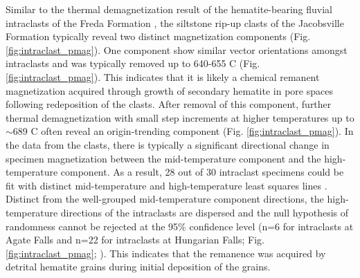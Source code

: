 \documentclass[draft]{agujournal2019}
\begin{document}
Similar to the thermal demagnetization result of the hematite-bearing fluvial intraclasts of the Freda Formation \cite{Swanson-Hysell2019b}, the siltstone rip-up clasts of the Jacobsville Formation typically reveal two distinct magnetization components (Fig. \ref{fig:intraclast_pmag}). One component show similar vector orientations amongst intraclasts and was typically removed up to 640-655 \textdegree C (Fig. \ref{fig:intraclast_pmag}). This indicates that it is likely a chemical remanent magnetization acquired through growth of secondary hematite in pore spaces following redeposition of the clasts. After removal of this component, further thermal demagnetization with small step increments at higher temperatures up to $\sim$689 \textdegree C often reveal an origin-trending component (Fig. \ref{fig:intraclast_pmag}). In the data from the clasts, there is typically a significant directional change in specimen magnetization between the mid-temperature component and the high-temperature component. As a result, 28 out of 30 intraclast specimens could be fit with distinct mid-temperature and high-temperature least squares lines \cite{Kirschvink1980a}. Distinct from the well-grouped mid-temperature component directions, the high-temperature directions of the intraclasts are dispersed and the null hypothesis of randomness cannot be rejected at the 95\% confidence level (n=6 for intraclasts at Agate Falls and n=22 for intraclasts at Hungarian Falls; Fig. \ref{fig:intraclast_pmag}; ). This indicates that the remanence was acquired by detrital hematite grains during initial deposition of the grains.
\end{document}
